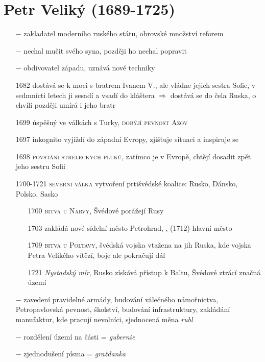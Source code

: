 \documentclass{article}
\begin{document}
\section*{Petr Veliký (1689-1725)}
\begin{itemize}
    \vspace{-0.5em}
    \setlength\itemsep{0.15em}
    \item[$-$] zakladatel moderního ruského státu, obrovské množství reforem
    \item[$-$] nechal mučit svého syna, později ho nechal popravit
    \item[$-$] obdivovatel západu, uznává nové techniky
    \item[1682] dostává se k moci s bratrem Ivanem V., ale vládne jejich sestra Sofie, v sedmnícti letech ji sesadí a vsadí do kláštera $\Rightarrow$ dostává se do čela Ruska, o chvíli později umírá i jeho bratr
    \item[1699] úspěšný ve válkách s Turky, \textsc{dobýjí pevnost Azov}
    \item[1697]  inkognito vyjíždí do západní Evropy, zjišťuje situaci a inspiruje se
    \item[1698] \textsc{povstání střeleckých pluků}, zatímco je v Evropě, chtějí dosadit zpět jeho sestru Sofii
    \item[1700-1721] \textsc{severní válka} vytvoření prtišvédské koalice: Rusko, Dánsko, Polsko, Sasko
    \begin{itemize}
        \vspace{-0.5em}
        \setlength\itemsep{0.15em}
        \item[1700] \textsc{bitva u Narvy}, Švédové porážejí Rusy
        \item[1703] zakládá nové sídelní město Petrohrad, , (1712) hlavní město
        \item[1709]  \textsc{bitva u Poltavy}, švédská vojska vtažena na jih Ruska, kde vojska Petra Velikého vítězí, boje ale pokračují dál
        \item[1721] \textit{Nystadský mír}, Rusko získává přístup k Baltu,  Švédové ztrácí značná území
    \end{itemize}
    \item[$-$] zavedení pravidelné armády, budování válečného námořnictva, Petropavlovská pevnost, školství, budování infrastruktury, zakládání manufaktur, kde pracují nevolníci, sjednocená měna \textit{rubl}
    \item[$-$] rozdělení území na části = \textit{gubernie}
    \item[$-$] zjednodušení písma = \textit{graždanka}
\end{itemize}
\end{document}
